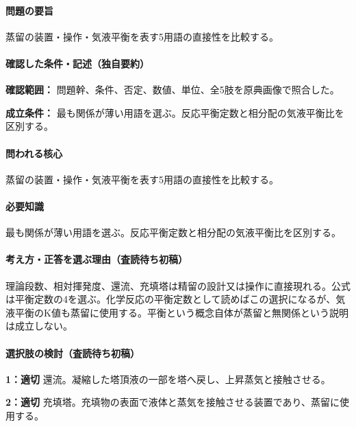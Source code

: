 \paragraph{問題の要旨} 蒸留の装置・操作・気液平衡を表す5用語の直接性を比較する。

\paragraph{確認した条件・記述（独自要約）}\mbox{}\par

\noindent\textbf{確認範囲：} 問題幹、条件、否定、数値、単位、全5肢を原典画像で照合した。\par

\noindent\textbf{成立条件：} 最も関係が薄い用語を選ぶ。反応平衡定数と相分配の気液平衡比を区別する。\par

\paragraph{問われる核心} 蒸留の装置・操作・気液平衡を表す5用語の直接性を比較する。

\paragraph{必要知識} 最も関係が薄い用語を選ぶ。反応平衡定数と相分配の気液平衡比を区別する。

\paragraph{考え方・正答を選ぶ理由（査読待ち初稿）} 理論段数、相対揮発度、還流、充填塔は精留の設計又は操作に直接現れる。公式は平衡定数の4を選ぶ。化学反応の平衡定数として読めばこの選択になるが、気液平衡のK値も蒸留に使用する。平衡という概念自体が蒸留と無関係という説明は成立しない。

\paragraph{選択肢の検討（査読待ち初稿）}\mbox{}\par

\noindent\textbf{1：適切} 還流。凝縮した塔頂液の一部を塔へ戻し、上昇蒸気と接触させる。\par

\noindent\textbf{2：適切} 充填塔。充填物の表面で液体と蒸気を接触させる装置であり、蒸留に使用する。\par

